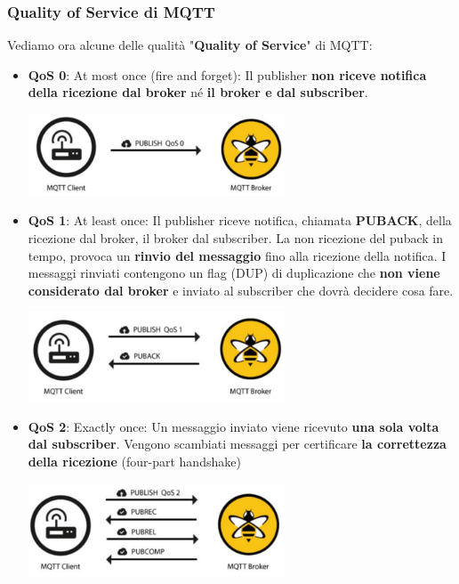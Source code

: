 \documentclass[12pt]{article}
\begin{document}
\subsubsection{Quality of Service di MQTT}
Vediamo ora alcune delle qualità "\textbf{Quality of Service}" di MQTT:
\begin{itemize}
    \item \textbf{QoS 0}: At most once (fire and forget): Il publisher \textbf{non riceve notifica della ricezione dal broker} né \textbf{il broker e dal subscriber}.
          \begin{center}
              \includegraphics[width = 0.60\textwidth]{Images/142.PNG}
          \end{center}
    \item \textbf{QoS 1}: At least once: Il publisher riceve notifica, chiamata \textbf{PUBACK}, della ricezione
          dal broker, il broker dal subscriber. La non ricezione del puback in tempo, provoca un
          \textbf{rinvio del messaggio} fino alla ricezione della notifica. I messaggi rinviati contengono un flag (DUP) di duplicazione che \textbf{non viene considerato dal broker} e inviato al subscriber che dovrà decidere cosa fare.
          \begin{center}
              \includegraphics[width = 0.60\textwidth]{Images/143.PNG}
          \end{center}
    \item \textbf{QoS 2}: Exactly once: Un messaggio inviato viene ricevuto \textbf{una sola volta
              dal subscriber}. Vengono scambiati messaggi per certificare \textbf{la correttezza della ricezione} (four-part handshake)
          \begin{center}
              \includegraphics[width = 0.60\textwidth]{Images/144.PNG}
          \end{center}
\end{itemize}
\end{document}
